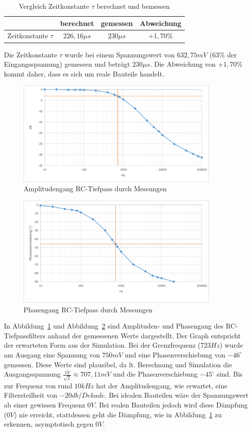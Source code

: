 \documentclass[12pt,a4paper,titlepage]{article}
\begin{document}
\begin{table}[H]
  \centering
  \begin{tabular}{|c|c|c|c|}
  \hline
                     & berechnet    & gemessen    & Abweichung \\ \hline
  Zeitkonstante $\tau$ & $226,16 \mu s$    & $230 \mu s$      & $+1,70 \%$ \\ \hline
  \end{tabular}
  \caption{Vergleich Zeitkonstante $\tau$ berechnet und bemessen}
  \label{Figure03}
\end{table}
\noindent Die Zeitkonstante $\tau$ wurde bei einem Spannungswert von $632,75 mV$ ($63 \%$ der Eingangsspannung) gemessen und betr\"agt $230 \mu s$. Die Abweichung von $+1,70 \%$ kommt daher, dass es sich um reale Bauteile handelt.

\begin{figure}[H]
  \centering
  \includegraphics[width=100mm]{amplitudengang_rc_tiefpass.png}
  \caption{Amplitudengang RC-Tiefpass durch Messungen}
  \label{Figure04}
\end{figure}
\begin{figure}[H]
  \centering
  \includegraphics[width=100mm]{phasengang_rc_tiefpass.png}
  \caption{Phasengang RC-Tiefpass durch Messungen}
  \label{Figure05}
\end{figure}
In Abbildung~\ref{Figure04} und Abbildung~\ref{Figure05} sind Amplituden- und Phasengang des RC-Tiefpassfilters anhand der gemessenen Werte dargestellt. Der Graph entspricht der erwarteten Form aus der Simulation. Bei der Grenzfrequenz ($723Hz$) wurde am Ausgang eine Spannung von $750mV$ und eine Phasenverschiebung von $-46^{\circ}$ gemessen. Diese Werte sind plausibel, da lt. Berechnung und Simulation die Ausgangsspannung $\frac{1V}{\sqrt{2}} \approx 707,11mV$ und die Phasenverschiebung $-45^{\circ}$ sind. Bis zur Frequenz von rund $10kHz$ hat der Amplitudengang, wie erwartet, eine Filtersteilheit von $-20db/Dekade$. Bei idealen Bauteilen w\"are der Spannungswert ab einer gewissen Frequenz $0 V$. Bei realen Bauteilen jedoch wird diese D\"ampfung ($0V$) nie erreicht, stattdessen geht die D\"ampfung, wie in Abbildung~\ref{Figure04} zu erkennen, asymptotisch gegen $0V$.
\end{document}
